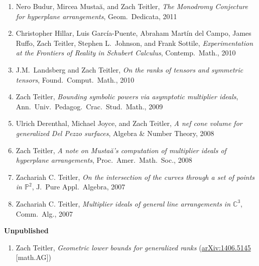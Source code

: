 \documentclass[12pt]{article}
\begin{document}
\begin{enumerate}[revarabic,leftmargin=*]
\item
Nero Budur, Mircea Musta\u{a}, and Zach Teitler,
\emph{The Monodromy Conjecture for hyperplane arrangements},
Geom.\ Dedicata,
2011

\item
Christopher Hillar, Luis Garc\'ia-Puente, Abraham Mart\'in del Campo, James Ruffo, Zach Teitler,
Stephen L.\ Johnson, and Frank Sottile,
\emph{Experimentation at the Frontiers of Reality in Schubert Calculus},
Contemp.\ Math.,
2010

\item J.M.~Landsberg and Zach Teitler,
\emph{On the ranks of tensors and symmetric tensors},
Found.\ Comput.\ Math.,
2010

\item Zach Teitler,
\emph{Bounding symbolic powers via asymptotic multiplier ideals},
Ann.\ Univ.\ Pedagog.\ Crac.\ Stud.\ Math.,
2009

\item Ulrich Derenthal, Michael Joyce, and Zach Teitler,
\emph{A nef cone volume for generalized Del Pezzo surfaces},
Algebra \& Number Theory,
2008

\item Zach Teitler,
\emph{A note on Musta\u{a}'s computation of multiplier ideals of hyperplane arrangements},
Proc.\ Amer.\ Math.\ Soc.,
2008

\item Zachariah C. Teitler,
\emph{On the intersection of the curves through a set of points in $\mathbb{P}^2$},
J.\ Pure Appl.\ Algebra,
2007

\item Zachariah C. Teitler,
\emph{Multiplier ideals of general line arrangements in $\mathbb{C}^3$},
Comm.\ Alg.,
2007

\end{enumerate}


\textbf{Unpublished}
\begin{enumerate}[revarabic]
\item Zach Teitler,
\emph{Geometric lower bounds for generalized ranks} %
(\href{http://arxiv.org/abs/1406.5145}{arXiv:1406.5145} [math.AG])
\end{enumerate}
\end{document}
